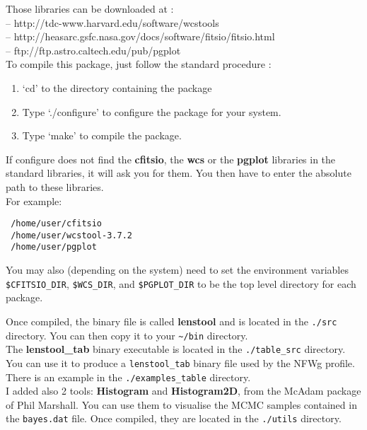 Those libraries can be downloaded at : \\
-- http://tdc-www.harvard.edu/software/wcstools\\
-- http://heasarc.gsfc.nasa.gov/docs/software/fitsio/fitsio.html\\
-- ftp://ftp.astro.caltech.edu/pub/pgplot\\

To compile this package, just follow the standard procedure :
\begin{enumerate}
\item `cd' to the directory containing the package

\item Type `./configure' to configure the package for your system.

\item Type `make' to compile the package.
\end{enumerate}

If configure does not find the \textbf{cfitsio}, the \textbf{wcs} or the
\textbf{pgplot} libraries in the standard libraries, it will ask you for them.
You then have to enter the absolute path to these libraries.\\ 
For example:
\begin{verbatim}
 /home/user/cfitsio
 /home/user/wcstool-3.7.2
 /home/user/pgplot
\end{verbatim}
You may also (depending on the system) need to set the environment variables 
\verb+$CFITSIO_DIR+, \verb+$WCS_DIR+, and \verb+$PGPLOT_DIR+ to be the top
level directory for each package.

Once compiled, the binary file is called \textbf{lenstool} and is located in the
\verb+./src+ directory. You can then copy it to your \verb+~/bin+ directory.\\

The \textbf{lenstool\_tab} binary executable is located in the
\verb+./table_src+ directory. You can use it to produce a \verb+lenstool_tab+
binary file used by the NFWg profile. There is an example in the
\verb+./examples_table+ directory.\\

I added also 2 tools: \textbf{Histogram} and \textbf{Histogram2D}, from the 
McAdam package of Phil Marshall. You can use them to visualise the MCMC samples
contained in  the \verb+bayes.dat+ file. Once compiled, they are located in the
\verb+./utils+ directory.\\

